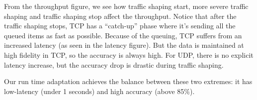 From the throughput figure, we see how traffic shaping start, more severe
traffic shaping and traffic shaping stop affect the throughput. Notice that
after the traffic shaping stops, TCP has a ``catch-up'' phase where it's sending
all the queued items as fast as possible. Because of the queuing, TCP suffers
from an increased latency (as seen in the latency figure). But the data is
maintained at high fidelity in TCP, so the accuracy is always high. For UDP,
there is no explicit latency increase, but the accuracy drop is drastic during
traffic shaping.

Our run time adaptation achieves the balance between these two extremes: it has
low-latency (under 1 seconds) and high accuracy (above 85\%).

\begin{figure}[!htb]
  \centering
  \begin{subfigure}[t]{0.33\textwidth}
    \centering

\end{subfigure}
\end{figure}
